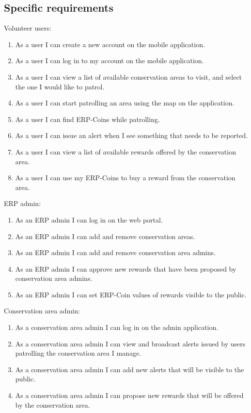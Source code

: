 \documentclass{article}
\begin{document}
\subsection{Specific requirements}
Volunteer users:
\begin{enumerate}
    \item As a user I can create a new account on the mobile application.
    \item As a user I can log in to my account on the mobile application.
    \item As a user I can view a list of available conservation areas to visit, and select the one I would like to patrol.
    \item As a user I can start patrolling an area using the map on the application.
    \item As a user I can find ERP-Coins while patrolling.
    \item As a user I can issue an alert when I see something that needs to be reported.
    \item As a user I can view a list of available rewards offered by the conservation area.
    \item As a user I can use my ERP-Coins to buy a reward from the conservation area.
\end{enumerate}
\vspace{3em}
ERP admin:
\begin{enumerate}
    \item As an ERP admin I can log in on the web portal.
    \item As an ERP admin I can add and remove conservation areas.
    \item As an ERP admin I can add and remove conservation area admins.
    \item As an ERP admin I can approve new rewards that have been proposed by conservation area admins.
    \item As an ERP admin I can set ERP-Coin values of rewards visible to the public.
\end{enumerate}
\vspace{2em}
Conservation area admin:
\begin{enumerate}
    \item As a conservation area admin I can log in on the admin application.
    \item As a conservation area admin I can view and broadcast alerts issued by users patrolling the conservation area I manage.
    \item As a conservation area admin I can add new alerts that will be visible to the public.
    \item As a conservation area admin I can propose new rewards that will be offered by the conservation area.
\end{enumerate}
\end{document}
